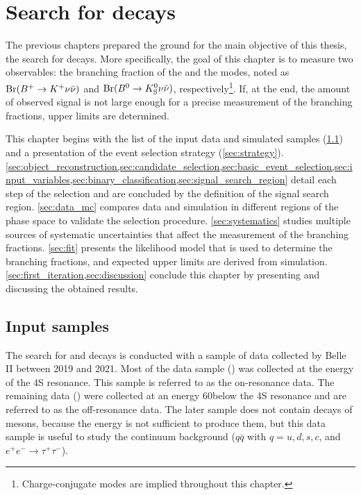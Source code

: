 \chapter[Search for \BKnn decays]{Search for {\boldmath \BKnn} decays} \label{ch:search_for_b2knn}
The previous chapters prepared the ground for the main objective of this thesis, the search for \BKnn decays.
More specifically, the goal of this chapter is to measure two observables: the branching fraction of the \BKpnn and the \BKznn modes, noted as $\mathrm{\mathrm{Br}}(B^+\rightarrow K^+\nu\bar{\nu})$ and $\mathrm{\mathrm{Br}}(B^0\rightarrow K^0_{\mathrm S}\nu\bar{\nu})$, respectively\footnote{Charge-conjugate modes are implied throughout this chapter.}.
If, at the end, the amount of observed signal is not large enough for a precise measurement of the branching fractions, upper limits are determined.

This chapter begins with the list of the input data and simulated samples (\cref{sec:input_samples}) and a presentation of the event selection strategy (\cref{sec:strategy}).
\cref{sec:object_reconstruction,sec:candidate_selection,sec:basic_event_selection,sec:input_variables,sec:binary_classification,sec:signal_search_region} detail each step of the selection and are concluded by the definition of the signal search region.
\cref{sec:data_mc} compares data and simulation in different regions of the phase space to validate the selection procedure.
\cref{sec:systematics} studies multiple sources of systematic uncertainties that affect the measurement of the branching fractions.
\cref{sec:fit} presents the likelihood model that is used to determine the branching fractions, and expected upper limits are derived from simulation.
\cref{sec:first_iteration,sec:discussion} conclude this chapter by presenting and discussing the obtained results.
\section{Input samples} \label{sec:input_samples}
The search for \BKpnn and \BKznn decays is conducted with a sample of data collected by Belle II between 2019 and 2021.
Most of the data sample (\lumion) was collected at the energy of the \Y4S resonance. This sample is referred to as the on-resonance data.
The remaining data (\lumioff) were collected at an energy 60\mev below the \Y4S resonance and are referred to as the off-resonance data.
The later sample does not contain decays of \B mesons, because the energy is not sufficient to produce them, but this data sample is useful to study the continuum background (\epem\to $q\bar{q}$ with $q=u,d,s,c$, and $e^+e^- \to \tau^{+} \tau^{-}$).

